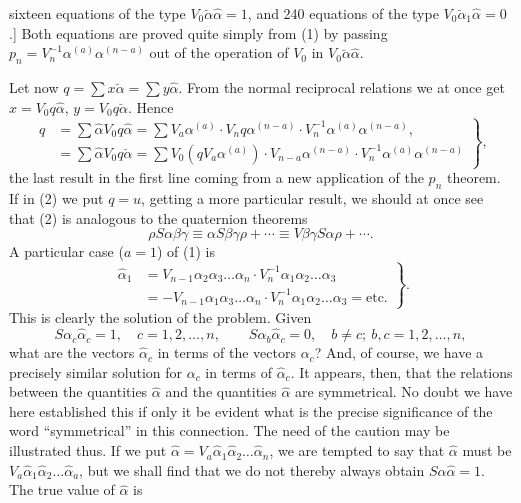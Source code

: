 \documentclass[11pt]{article}
\begin{document}
sixteen equations of the type $V_0\breve\alpha\hat\alpha=1$, and 240 equations of the type $V_0\breve\alpha_1\hat\alpha=0$.] Both equations are proved quite simply from (1) by passing $p_n=V_n^{-1}\alpha^{(a)}\alpha^{(n-a)}$ out of the operation of $V_0$ in $V_0\breve\alpha\hat\alpha$.

\indent Let now $q=\sum x\breve\alpha=\sum y\hat\alpha$. From the normal reciprocal relations we at once get $x=V_0q\hat\alpha$, $y=V_0q\breve\alpha$. Hence
\begin{equation}\left.\begin{aligned}q&=\sum\hat\alpha V_0q\hat\alpha=\sum V_a\alpha^{(a)}\cdot V_nq\alpha^{(n-a)}\cdot V_n^{-1}\alpha^{(a)}\alpha^{(n-a)},\\&=\sum\hat\alpha V_0q\breve\alpha=\sum V_0(qV_a\alpha^{(a)})\cdot V_{n-a}\alpha^{(n-a)}\cdot V_n^{-1}\alpha^{(a)}\alpha^{(n-a)}\end{aligned}\right\},\tag{2}\end{equation}
the last result in the first line coming from a new application of the $p_n$ theorem. If in (2) we put $q=u$, getting a more particular result, we should at once see that (2) is analogous to the quaternion theorems
\[\rho S\alpha\beta\gamma\equiv\alpha S\beta\gamma\rho+\cdots\equiv V\beta\gamma S\alpha\rho+\cdots.\]
A particular case ($a=1$) of (1) is
\begin{equation}\left.\begin{aligned}\hat\alpha_1&=V_{n-1}\alpha_2\alpha_3\ldots\alpha_n\cdot V_n^{-1}\alpha_1\alpha_2\ldots\alpha_3\\&=-V_{n-1}\alpha_1\alpha_3\ldots\alpha_n\cdot V_n^{-1}\alpha_1\alpha_2\ldots\alpha_3=\text{etc.}\end{aligned}\right\}.\tag{3}\end{equation}
This is clearly the solution of the problem. Given
\[S\alpha_c\hat\alpha_c=1,\quad c=1,2,\ldots,n,\qquad S\alpha_b\hat\alpha_c=0,\quad b\ne c;\ b,c=1,2,\ldots,n,\]
what are the vectors $\hat\alpha_c$ in terms of the vectors $\alpha_c$? And, of course, we have a precisely similar solution for $\alpha_c$ in terms of $\hat\alpha_c$. It appears, then, that the relations between the quantities $\hat\alpha$ and the quantities $\hat\alpha$ are symmetrical. No doubt we have here established this if only it be evident what is the precise significance of the word ``symmetrical'' in this connection. The need of the caution may be illustrated thus. If we put $\hat\alpha=V_a\hat\alpha_1\hat\alpha_2\ldots\hat\alpha_n$, we are tempted to say that $\hat\alpha$ must be $V_a\hat\alpha_1\hat\alpha_2\ldots\hat\alpha_a$, but we shall find that we do not thereby always obtain $S\hat\alpha\hat\alpha=1$. The true value of $\hat\alpha$ is
\end{document}
